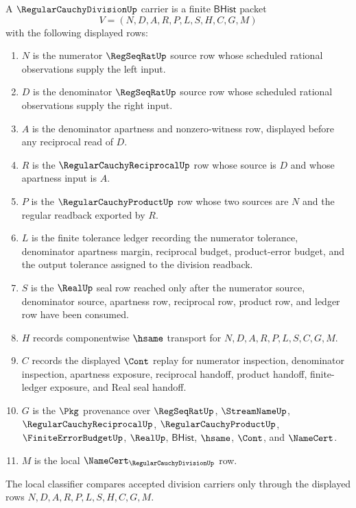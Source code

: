 \begin{definition}
\label{def:regular-cauchy-division-carrier}
A $\RegularCauchyDivisionUp$ carrier is a finite $\mathsf{BHist}$ packet
$$
V=(N,D,A,R,P,L,S,H,C,G,M)
$$
with the following displayed rows:
\begin{enumerate}
\item $N$ is the numerator $\RegSeqRatUp$ source row whose scheduled rational observations supply the left input.
\item $D$ is the denominator $\RegSeqRatUp$ source row whose scheduled rational observations supply the right input.
\item $A$ is the denominator apartness and nonzero-witness row, displayed before any reciprocal read of $D$.
\item $R$ is the $\RegularCauchyReciprocalUp$ row whose source is $D$ and whose apartness input is $A$.
\item $P$ is the $\RegularCauchyProductUp$ row whose two sources are $N$ and the regular readback exported by $R$.
\item $L$ is the finite tolerance ledger recording the numerator tolerance, denominator apartness margin, reciprocal budget, product-error budget, and the output tolerance assigned to the division readback.
\item $S$ is the $\RealUp$ seal row reached only after the numerator source, denominator source, apartness row, reciprocal row, product row, and ledger row have been consumed.
\item $H$ records componentwise $\hsame$ transport for $N,D,A,R,P,L,S,C,G,M$.
\item $C$ records the displayed $\Cont$ replay for numerator inspection, denominator inspection, apartness exposure, reciprocal handoff, product handoff, finite-ledger exposure, and Real seal handoff.
\item $G$ is the $\Pkg$ provenance over $\RegSeqRatUp$, $\StreamNameUp$, $\RegularCauchyReciprocalUp$, $\RegularCauchyProductUp$, $\FiniteErrorBudgetUp$, $\RealUp$, $\mathsf{BHist}$, $\hsame$, $\Cont$, and $\NameCert$.
\item $M$ is the local $\NameCert_{\RegularCauchyDivisionUp}$ row.
\end{enumerate}
The local classifier compares accepted division carriers only through the displayed rows $N,D,A,R,P,L,S,H,C,G,M$.
\end{definition}

